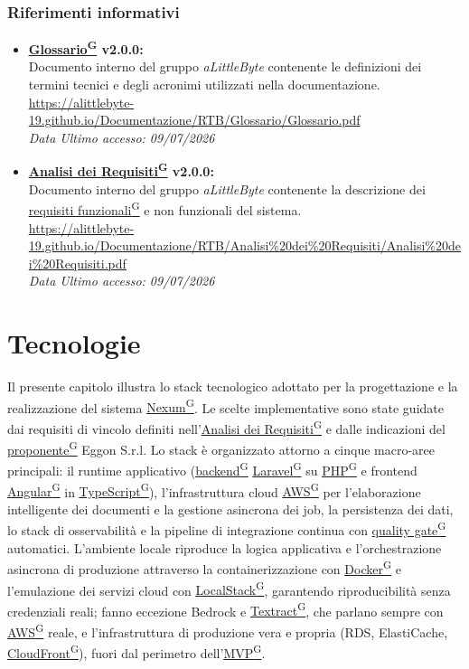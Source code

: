 \documentclass[a4paper,12pt]{article}
\providecommand{\glslink}[2]{\href{https://alittlebyte-19.github.io/Documentazione/glossario.html\#gls-#1}{\underline{#2}\textsuperscript{\scriptsize G}}}
\begin{document}
\subsubsection{Riferimenti informativi}
\begin{itemize}
    \item \textbf{\glslink{glossario}{Glossario} v2.0.0:}\\
    Documento interno del gruppo \textit{aLittleByte} contenente le definizioni dei termini tecnici e degli acronimi utilizzati nella documentazione.\\
    \url{https://alittlebyte-19.github.io/Documentazione/RTB/Glossario/Glossario.pdf}\\
    \textit{Data Ultimo accesso: 09/07/2026}

    \item \textbf{\glslink{analisi-dei-requisiti-adr}{Analisi dei Requisiti} v2.0.0:}\\
    Documento interno del gruppo \textit{aLittleByte} contenente la descrizione dei \glslink{requisiti-funzionali}{requisiti funzionali} e non funzionali del sistema.\\
    \url{https://alittlebyte-19.github.io/Documentazione/RTB/Analisi\%20dei\%20Requisiti/Analisi\%20dei\%20Requisiti.pdf}\\
    \textit{Data Ultimo accesso: 09/07/2026}

\end{itemize}

\section{Tecnologie}

Il presente capitolo illustra lo stack tecnologico adottato per la progettazione e la realizzazione del sistema \glslink{nexum}{Nexum}. Le scelte implementative sono state guidate dai requisiti di vincolo definiti nell'\glslink{analisi-dei-requisiti-adr}{Analisi dei Requisiti} e dalle indicazioni del \glslink{committente-proponente}{proponente} Eggon S.r.l. Lo stack è organizzato attorno a cinque macro-aree principali: il runtime applicativo (\glslink{backend}{backend} \glslink{laravel}{Laravel} su \glslink{php}{PHP} e frontend \glslink{angular}{Angular} in \glslink{typescript}{TypeScript}), l'infrastruttura cloud \glslink{aws}{AWS} per l'elaborazione intelligente dei documenti e la gestione asincrona dei job, la persistenza dei dati, lo stack di osservabilità e la pipeline di integrazione continua con \glslink{quality-gate}{quality gate} automatici. L'ambiente locale riproduce la logica applicativa e l'orchestrazione asincrona di produzione attraverso la containerizzazione con \glslink{docker}{Docker} e l'emulazione dei servizi cloud con \glslink{localstack}{LocalStack}, garantendo riproducibilità senza credenziali reali; fanno eccezione Bedrock e \glslink{textract}{Textract}, che parlano sempre con \glslink{aws}{AWS} reale, e l'infrastruttura di produzione vera e propria (RDS, ElastiCache, \glslink{cloudfront}{CloudFront}), fuori dal perimetro dell'\glslink{mvp-minimum-viable-product}{MVP}.
\end{document}
